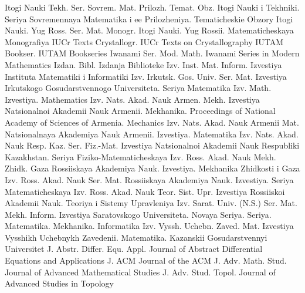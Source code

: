 {Itogi Nauki Tekh. Ser. Sovrem. Mat. Prilozh. Temat. Obz.}
{Itogi Nauki i Tekhniki. Seriya Sovremennaya Matematika i ee Prilozheniya. Tematicheskie Obzory}
{Itogi Nauki. Yug Ross. Ser. Mat. Monogr.}
{Itogi Nauki. Yug Rossii. Matematicheskaya Monografiya}
{IUCr Texts Crystallogr.}
{IUCr Texts on Crystallography}
{IUTAM Bookser.}
{IUTAM Bookseries}
{Iwanami Ser. Mod. Math.}
{Iwanami Series in Modern Mathematics}
{Izdan. Bibl.}
{Izdanja Biblioteke}
{Izv. Inst. Mat. Inform.}
{Izvestiya Instituta Matematiki i Informatiki}
{Izv. Irkutsk. Gos. Univ. Ser. Mat.}
{Izvestiya Irkutskogo Gosudarstvennogo Universiteta. Seriya Matematika}
{Izv. Math.}
{Izvestiya. Mathematics}
{Izv. Nats. Akad. Nauk Armen. Mekh.}
{Izvestiya Natsionalnoi Akademii Nauk Armenii. Mekhanika. Proceedings of National Academy of Sciences of Armenia. Mechanics}
{Izv. Nats. Akad. Nauk Armenii Mat.}
{Natsionalnaya Akademiya Nauk Armenii. Izvestiya. Matematika}
{Izv. Nats. Akad. Nauk Resp. Kaz. Ser. Fiz.-Mat.}
{Izvestiya Natsionalnoi Akademii Nauk Respubliki Kazakhstan. Seriya Fiziko-Matematicheskaya}
{Izv. Ross. Akad. Nauk Mekh. Zhidk. Gaza}
{Rossiiskaya Akademiya Nauk. Izvestiya. Mekhanika Zhidkosti i Gaza}
{Izv. Ross. Akad. Nauk Ser. Mat.}
{Rossiiskaya Akademiya Nauk. Izvestiya. Seriya Matematicheskaya}
{Izv. Ross. Akad. Nauk Teor. Sist. Upr.}
{Izvestiya Rossiiskoi Akademii Nauk. Teoriya i Sistemy Upravleniya}
{Izv. Sarat. Univ. (N.S.) Ser. Mat. Mekh. Inform.}
{Izvestiya Saratovskogo Universiteta. Novaya Seriya. Seriya. Matematika. Mekhanika. Informatika}
{Izv. Vyssh. Uchebn. Zaved. Mat.}
{Izvestiya Vysshikh Uchebnykh Zavedenii. Matematika. Kazanskii Gosudarstvennyi Universitet}
{J. Abstr. Differ. Equ. Appl.}
{Journal of Abstract Differential Equations and Applications}
{J. ACM}
{Journal of the ACM}
{J. Adv. Math. Stud.}
{Journal of Advanced Mathematical Studies}
{J. Adv. Stud. Topol.}
{Journal of Advanced Studies in Topology}
